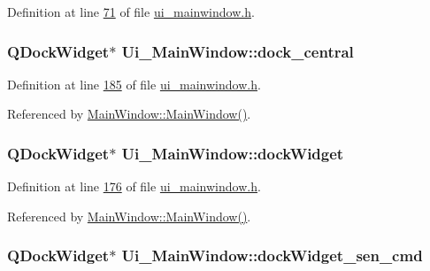 Definition at line \hyperlink{a00139_source_l00071}{71} of file \hyperlink{a00139_source}{ui\+\_\+mainwindow.\+h}.

\hypertarget{a00080_a19105d0d919fa33b5f29f7677bbab054}{
\subsubsection[{dock\+\_\+central}]{\setlength{\rightskip}{0pt plus 5cm}Q\+Dock\+Widget$\ast$ Ui\+\_\+\+Main\+Window\+::dock\+\_\+central}}\label{a00080_a19105d0d919fa33b5f29f7677bbab054}


Definition at line \hyperlink{a00139_source_l00185}{185} of file \hyperlink{a00139_source}{ui\+\_\+mainwindow.\+h}.



Referenced by \hyperlink{a00109_source_l00024}{Main\+Window\+::\+Main\+Window()}.

\hypertarget{a00080_ac8a083c4b66fb317a9b538409ce412e2}{
\subsubsection[{dock\+Widget}]{\setlength{\rightskip}{0pt plus 5cm}Q\+Dock\+Widget$\ast$ Ui\+\_\+\+Main\+Window\+::dock\+Widget}}\label{a00080_ac8a083c4b66fb317a9b538409ce412e2}


Definition at line \hyperlink{a00139_source_l00176}{176} of file \hyperlink{a00139_source}{ui\+\_\+mainwindow.\+h}.



Referenced by \hyperlink{a00109_source_l00024}{Main\+Window\+::\+Main\+Window()}.

\hypertarget{a00080_a9eb86a5ee396766f0f4a65f2d2bd7688}{
\subsubsection[{dock\+Widget\+\_\+sen\+\_\+cmd}]{\setlength{\rightskip}{0pt plus 5cm}Q\+Dock\+Widget$\ast$ Ui\+\_\+\+Main\+Window\+::dock\+Widget\+\_\+sen\+\_\+cmd}}\label{a00080_a9eb86a5ee396766f0f4a65f2d2bd7688}


